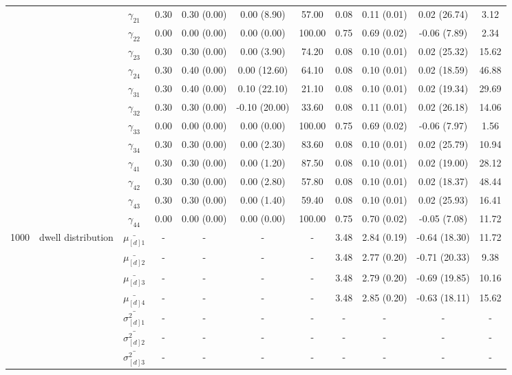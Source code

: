 \begin{table}[h]
{\begin{tabular}{ccccccccccc}
 &  & $\gamma_{21}$ & 0.30 & 0.30 (0.00) & 0.00 (8.90) & 57.00 & 0.08 & 0.11 (0.01) & 0.02 (26.74) & 3.12 \\
 &  & $\gamma_{22}$ & 0.00 & 0.00 (0.00) & 0.00 (0.00) & 100.00 & 0.75 & 0.69 (0.02) & -0.06 (7.89) & 2.34 \\
 &  & $\gamma_{23}$ & 0.30 & 0.30 (0.00) & 0.00 (3.90) & 74.20 & 0.08 & 0.10 (0.01) & 0.02 (25.32) & 15.62 \\
 &  & $\gamma_{24}$ & 0.30 & 0.40 (0.00) & 0.00 (12.60) & 64.10 & 0.08 & 0.10 (0.01) & 0.02 (18.59) & 46.88 \\
 &  & $\gamma_{31}$ & 0.30 & 0.40 (0.00) & 0.10 (22.10) & 21.10 & 0.08 & 0.10 (0.01) & 0.02 (19.34) & 29.69 \\
 &  & $\gamma_{32}$ & 0.30 & 0.30 (0.00) & -0.10 (20.00) & 33.60 & 0.08 & 0.11 (0.01) & 0.02 (26.18) & 14.06 \\
 &  & $\gamma_{33}$ & 0.00 & 0.00 (0.00) & 0.00 (0.00) & 100.00 & 0.75 & 0.69 (0.02) & -0.06 (7.97) & 1.56 \\
 &  & $\gamma_{34}$ & 0.30 & 0.30 (0.00) & 0.00 (2.30) & 83.60 & 0.08 & 0.10 (0.01) & 0.02 (25.79) & 10.94 \\
 &  & $\gamma_{41}$ & 0.30 & 0.30 (0.00) & 0.00 (1.20) & 87.50 & 0.08 & 0.10 (0.01) & 0.02 (19.00) & 28.12 \\
 &  & $\gamma_{42}$ & 0.30 & 0.30 (0.00) & 0.00 (2.80) & 57.80 & 0.08 & 0.10 (0.01) & 0.02 (18.37) & 48.44 \\
 &  & $\gamma_{43}$ & 0.30 & 0.30 (0.00) & 0.00 (1.40) & 59.40 & 0.08 & 0.10 (0.01) & 0.02 (25.93) & 16.41 \\
 &  & $\gamma_{44}$ & 0.00 & 0.00 (0.00) & 0.00 (0.00) & 100.00 & 0.75 & 0.70 (0.02) & -0.05 (7.08) & 11.72 \\ \midrule
1000 & dwell distribution & $\bar{\mu_{[d]1}}$ & - & - & - & - & 3.48 & 2.84 (0.19) & -0.64 (18.30) & 11.72 \\
\multirow{39}{*}{} & \multirow{7}{*}{} & $\bar{\mu_{[d]2}}$ & - & - & - & - & 3.48 & 2.77 (0.20) & -0.71 (20.33) & 9.38 \\
 &  & $\bar{\mu_{[d]3}}$ & - & - & - & - & 3.48 & 2.79 (0.20) & -0.69 (19.85) & 10.16 \\
 &  & $\bar{\mu_{[d]4}}$ & - & - & - & - & 3.48 & 2.85 (0.20) & -0.63 (18.11) & 15.62 \\
 &  & $\bar{\sigma^2_{[d]1}}$ & - & - & - & - & - & - & - & - \\
 &  & $\bar{\sigma^2_{[d]2}}$ & - & - & - & - & - & - & - & - \\
 &  & $\bar{\sigma^2_{[d]3}}$ & - & - & - & - & - & - & - & - \\

\end{tabular}}
\end{table}

